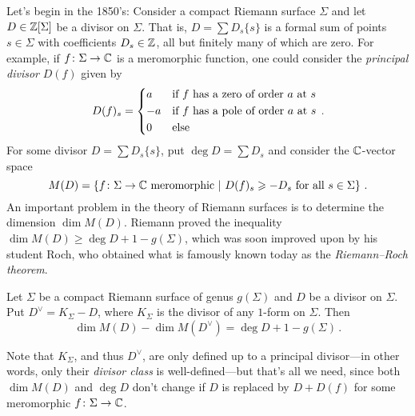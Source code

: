 \documentclass[a4paper, 10pt, oneside, DIV=9, chapterprefix=true, numbers=enddot,bibliography=totoc]{scrbook}
\begin{document}
	Let's begin in the 1850's: Consider a compact Riemann surface $\Sigma$ and let $D\in\mathbb{Z}[\Sigma]$ be a divisor on $\Sigma$. That is, $D=\sum D_s\{s\}$ is a formal sum of points $s\in\Sigma$ with coefficients $D_s\in\mathbb{Z}$, all but finitely many of which are zero. For example, if $f\colon \Sigma\morphism \IC$ is a meromorphic function, one could consider the \emph{principal divisor} $D(f)$ given by
	\begin{equation*}
		D(f)_s=\begin{cases*}
			a & if $f$ has a zero of order $a$ at $s$\\
			-a & if $f$ has a pole of order $a$ at $s$\\
			0 & else
		\end{cases*}\,.
	\end{equation*}
	For some divisor $D=\sum D_s\{s\}$, put $\deg D=\sum D_s$ and consider the $\mathbb{C}$-vector space
	\begin{equation*}
		M(D)=\left\{f\colon \Sigma\rightarrow\mathbb{C}\text{ meromorphic}\ \middle|\  D(f)_s\geqslant -D_s\text{ for all }s\in\Sigma\right\}\,.
	\end{equation*}
	An important problem in the theory of Riemann surfaces is to determine the dimension $\dim M(D)$. Riemann proved the inequality $\dim M(D)\geq \deg D+1-g(\Sigma)$, which was soon improved upon by his student Roch, who obtained what is famously known today as the \emph{Riemann--Roch theorem}.
	\begin{thm}\label{thm:RiemannRoch}
		Let $\Sigma$ be a compact Riemann surface of genus $g(\Sigma)$ and $D$ be a divisor on $\Sigma$. Put $D^\vee=K_\Sigma-D$, where $K_\Sigma$ is the divisor of any $1$-form on $\Sigma$. Then
		\begin{equation*}
			\dim M(D)-\dim M(D^\vee)=\deg D+1-g(\Sigma)\,.
		\end{equation*}
	\end{thm}
	Note that $K_\Sigma$, and thus $D^\vee$, are only defined up to a principal divisor---in other words, only their \emph{divisor class} is well-defined---but that's all we need, since both $\dim M(D)$ and $\deg D$ don't change if $D$ is replaced by $D+D(f)$ for some meromorphic $f\colon \Sigma\morphism\IC$. 
	
\end{document}
